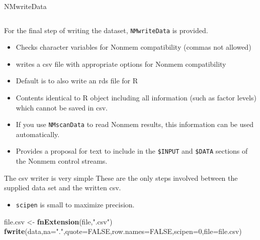 \documentclass[
  8pt,
  ignorenonframetext,
  aspectratio=169]{beamer}
\newenvironment{Shaded}{\begin{snugshade}}{\end{snugshade}}
\newcommand{\DataTypeTok}[1]{\textcolor[rgb]{0.13,0.29,0.53}{#1}}
\newcommand{\DecValTok}[1]{\textcolor[rgb]{0.00,0.00,0.81}{#1}}
\newcommand{\KeywordTok}[1]{\textcolor[rgb]{0.13,0.29,0.53}{\textbf{#1}}}
\newcommand{\NormalTok}[1]{#1}
\newcommand{\OtherTok}[1]{\textcolor[rgb]{0.56,0.35,0.01}{#1}}
\newcommand{\StringTok}[1]{\textcolor[rgb]{0.31,0.60,0.02}{#1}}
\providecommand{\tightlist}{%
  \setlength{\itemsep}{0pt}\setlength{\parskip}{0pt}}
\begin{document}
\begin{frame}[fragile]{NMwriteData}
\protect\hypertarget{nmwritedata}{}
\begin{columns}[T]
\begin{column}{0.48\textwidth}
For the final step of writing the dataset, \texttt{NMwriteData} is
provided.

\begin{itemize}
\item
  Checks character variables for Nonmem compatibility (commas not
  allowed)
\item
  writes a csv file with appropriate options for Nonmem compatibility
\item
  Default is to also write an rds file for R
\item
  Contents identical to R object including all information (such as
  factor levels) which cannot be saved in csv.
\item
  If you use \texttt{NMscanData} to read Nonmem results, this
  information can be used automatically.
\item
  Provides a proposal for text to include in the \texttt{\$INPUT} and
  \texttt{\$DATA} sections of the Nonmem control streams.
\end{itemize}

\begin{block}{The csv writer is very simple}
\protect\hypertarget{the-csv-writer-is-very-simple}{}
These are the only steps involved between the supplied data set and the
written csv.

\begin{itemize}
\tightlist
\item
  \texttt{scipen} is small to maximize precision.
\end{itemize}

\footnotesize

\begin{Shaded}
\begin{Highlighting}[]
\NormalTok{file.csv \textless{}{-}}\StringTok{ }\KeywordTok{fnExtension}\NormalTok{(file,}\StringTok{".csv"}\NormalTok{)}
\KeywordTok{fwrite}\NormalTok{(data,}\DataTypeTok{na=}\StringTok{"."}\NormalTok{,}\DataTypeTok{quote=}\OtherTok{FALSE}\NormalTok{,}\DataTypeTok{row.names=}\OtherTok{FALSE}\NormalTok{,}\DataTypeTok{scipen=}\DecValTok{0}\NormalTok{,}\DataTypeTok{file=}\NormalTok{file.csv)}
\end{Highlighting}
\end{Shaded}

\normalsize


\end{block}
\end{column}
\end{columns}
\end{frame}
\end{document}

